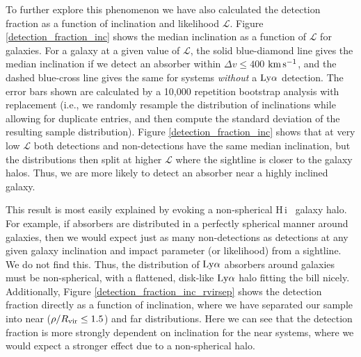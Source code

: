 \documentclass[twocolumn,tighten]{aastex62}
\newcommand{\kms}{$\rm km\, s^{-1}$}
\newcommand{\HI}{\mbox{H\,{\sc i}} }
\begin{document}
To further explore this phenomenon we have also calculated the detection fraction as a function of inclination and likelihood $\mathcal{L}$. Figure \ref{detection_fraction_inc} shows the median inclination as a function of $\mathcal{L}$ for galaxies. For a galaxy at a given value of $\mathcal{L}$, the solid blue-diamond line gives the median inclination if we detect an absorber within $\Delta v \leq 400$ \kms, and the dashed blue-cross line gives the same for systems \emph{without} a $\rm Ly\alpha$ detection. The error bars shown are calculated by a 10,000 repetition bootstrap analysis with replacement (i.e., we randomly resample the distribution of inclinations while allowing for duplicate entries, and then compute the standard deviation of the resulting sample distribution). Figure \ref{detection_fraction_inc} shows that at very low $\mathcal{L}$ both detections and non-detections have the same median inclination, but the distributions then split at higher $\mathcal{L}$ where the sightline is closer to the galaxy halos. Thus, we are more likely to detect an absorber near a highly inclined galaxy. 


This result is most easily explained by evoking a non-spherical \HI~galaxy halo. For example, if absorbers are distributed in a perfectly spherical manner around galaxies, then we would expect just as many non-detections as detections at any given galaxy inclination and impact parameter (or likelihood) from a sightline. We do not find this. Thus, the distribution of $\rm Ly\alpha$ absorbers around galaxies must be non-spherical, with a flattened, disk-like $\rm Ly\alpha$ halo fitting the bill nicely. Additionally, Figure \ref{detection_fraction_inc_rvirsep} shows the detection fraction directly as a function of inclination, where we have separated our sample into near ($\rho / R_{\rm vir} \leq 1.5$) and far distributions. Here we can see that the detection fraction is more strongly dependent on inclination for the near systems, where we would expect a stronger effect due to a non-spherical halo.






\end{document}

